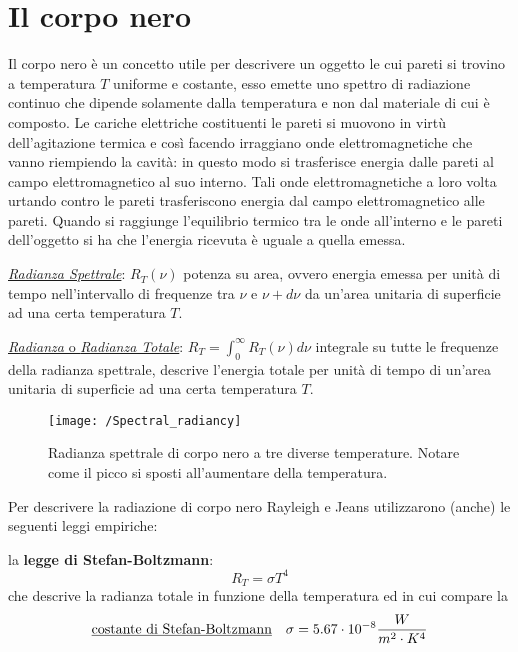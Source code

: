 

\section{Il corpo nero}
Il corpo nero è un concetto utile per descrivere un oggetto le cui pareti si trovino a temperatura $T$ uniforme e costante, esso emette uno spettro di radiazione continuo che dipende solamente dalla temperatura e non dal materiale di cui è composto.
Le cariche elettriche costituenti le pareti si muovono in virtù dell'agitazione termica e così facendo irraggiano onde elettromagnetiche che vanno riempiendo la cavità: in questo modo si trasferisce energia dalle pareti al campo elettromagnetico al suo interno.
Tali onde elettromagnetiche a loro volta urtando contro le pareti trasferiscono energia dal campo elettromagnetico alle pareti.
Quando si raggiunge l'equilibrio termico tra le onde all'interno e le pareti dell'oggetto si ha che l'energia ricevuta è uguale a quella emessa.

\underline{\textit{Radianza Spettrale}}: $R_T(\nu)$ potenza su area, ovvero energia emessa per unità di tempo nell'intervallo di frequenze tra $\nu$ e $\nu+d\nu$ da un'area unitaria di superficie ad una certa temperatura $T$.

\underline{\textit{Radianza} o \textit{Radianza Totale}}: $R_T= \int_0^{\infty} R_T(\nu)d\nu$ integrale su tutte le frequenze della radianza spettrale, descrive l'energia totale per unità di tempo di un'area unitaria di superficie ad una certa temperatura $T$.

\begin{figure}[h]
\centering
\texttt{[image: /Spectral\_radiancy]}
\caption{Radianza spettrale di corpo nero a tre diverse temperature. Notare come il picco si sposti all'aumentare della temperatura.}
\end{figure}

Per descrivere la radiazione di corpo nero Rayleigh e Jeans utilizzarono (anche) le seguenti leggi empiriche:

la \textbf{legge di Stefan-Boltzmann}:
\begin{equation}
R_T = \sigma T^4
\end{equation}
che descrive la radianza totale in funzione della temperatura ed in cui compare la 
\begin{equation}
\mbox{\underline{costante di Stefan-Boltzmann}} \quad \sigma = 5.67 \cdot 10^{-8} \frac{W}{m^2 \cdot K^4}
\end{equation}

